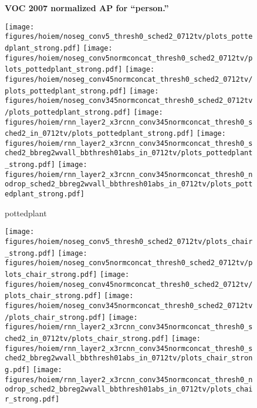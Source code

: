 \documentclass[10pt,twocolumn,letterpaper]{article}
\begin{document}
\begin{figure}[t]
\begin{center}
  \end{center}
  \vspace{-12pt}
  \caption{%
    \textbf{VOC 2007 normalized AP for ``person.''}
  }
  \label{fig:hoiem}
\end{figure}\begin{figure}[t]
  \begin{center}
   \texttt{[image: figures/hoiem/noseg\_conv5\_thresh0\_sched2\_0712tv/plots\_pottedplant\_strong.pdf]}
   \texttt{[image: figures/hoiem/noseg\_conv5normconcat\_thresh0\_sched2\_0712tv/plots\_pottedplant\_strong.pdf]}
   \texttt{[image: figures/hoiem/noseg\_conv45normconcat\_thresh0\_sched2\_0712tv/plots\_pottedplant\_strong.pdf]}
   \texttt{[image: figures/hoiem/noseg\_conv345normconcat\_thresh0\_sched2\_0712tv/plots\_pottedplant\_strong.pdf]}
   \texttt{[image: figures/hoiem/rnn\_layer2\_x3rcnn\_conv345normconcat\_thresh0\_sched2\_in\_0712tv/plots\_pottedplant\_strong.pdf]}
   \texttt{[image: figures/hoiem/rnn\_layer2\_x3rcnn\_conv345normconcat\_thresh0\_sched2\_bbreg2wvall\_bbthresh01abs\_in\_0712tv/plots\_pottedplant\_strong.pdf]}
   \texttt{[image: figures/hoiem/rnn\_layer2\_x3rcnn\_conv345normconcat\_thresh0\_nodrop\_sched2\_bbreg2wvall\_bbthresh01abs\_in\_0712tv/plots\_pottedplant\_strong.pdf]}
  \end{center}
  \vspace{-12pt}
  \caption{%
    pottedplant
  }
  \label{fig:hoiem}
\end{figure}\begin{figure}[t]
  \begin{center}
   \texttt{[image: figures/hoiem/noseg\_conv5\_thresh0\_sched2\_0712tv/plots\_chair\_strong.pdf]}
   \texttt{[image: figures/hoiem/noseg\_conv5normconcat\_thresh0\_sched2\_0712tv/plots\_chair\_strong.pdf]}
   \texttt{[image: figures/hoiem/noseg\_conv45normconcat\_thresh0\_sched2\_0712tv/plots\_chair\_strong.pdf]}
   \texttt{[image: figures/hoiem/noseg\_conv345normconcat\_thresh0\_sched2\_0712tv/plots\_chair\_strong.pdf]}
   \texttt{[image: figures/hoiem/rnn\_layer2\_x3rcnn\_conv345normconcat\_thresh0\_sched2\_in\_0712tv/plots\_chair\_strong.pdf]}
   \texttt{[image: figures/hoiem/rnn\_layer2\_x3rcnn\_conv345normconcat\_thresh0\_sched2\_bbreg2wvall\_bbthresh01abs\_in\_0712tv/plots\_chair\_strong.pdf]}
   \texttt{[image: figures/hoiem/rnn\_layer2\_x3rcnn\_conv345normconcat\_thresh0\_nodrop\_sched2\_bbreg2wvall\_bbthresh01abs\_in\_0712tv/plots\_chair\_strong.pdf]}

\end{center}
\end{figure}
\end{document}
